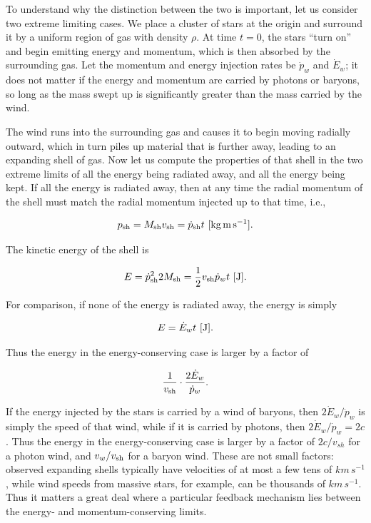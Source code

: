 \documentclass[a4paper,10pt]{article}
\begin{document}
{\noindent}To understand why the distinction between the two is important, let us consider two extreme limiting cases. We place a cluster of stars at the origin and surround it by a uniform region of gas with density $\rho$. At time $t=0$, the stars ``turn on'' and begin emitting energy and momentum, which is then absorbed by the surrounding gas. Let the momentum and energy injection rates be $\dot{p}_w$ and $\dot{E}_w$; it does not matter if the energy and momentum are carried by photons or baryons, so long as the mass swept up is significantly greater than the mass carried by the wind.

{\noindent}The wind runs into the surrounding gas and causes it to begin moving radially outward, which in turn piles up material that is further away, leading to an expanding shell of gas. Now let us compute the properties of that shell in the two extreme limits of all the energy being radiated away, and all the energy being kept. If all the energy is radiated away, then at any time the radial momentum of the shell must match the radial momentum injected up to that time, i.e.,

\begin{align*}
    p_{\rm sh} = M_{\rm sh}v_{\rm sh} = \dot{p}_{\rm sh}t ~ [{\rm kg\,m\,s^{-1}}].
\end{align*}

{\noindent}The kinetic energy of the shell is

\begin{align*}
    E = \dot{p}_{\rm sh}^2 2M_{\rm sh} = \frac{1}{2}v_{\rm sh}\dot{p}_wt ~ [{\rm J}].
\end{align*}

{\noindent}For comparison, if none of the energy is radiated away, the energy is simply

\begin{align*}
    E = \dot{E}_wt ~ [{\rm J}].
\end{align*}

{\noindent}Thus the energy in the energy-conserving case is larger by a factor of

\begin{align*}
    \frac{1}{v_{\rm sh}}\cdot\frac{2\dot{E}_w}{\dot{p}_w}.
\end{align*}

{\noindent}If the energy injected by the stars is carried by a wind of baryons, then $2\dot{E}_w/\dot{p}_w$ is simply the speed of that wind, while if it is carried by photons, then $2\dot{E}_w/\dot{p}_w=2c$. Thus the energy in the energy-conserving case is larger by a factor of $2c/v_{sh}$ for a photon wind, and $v_w/v_{\rm sh}$ for a baryon wind. These are not small factors: observed expanding shells typically have velocities of at most a few tens of $km\,s^{-1}$, while wind speeds from massive stars, for example, can be thousands of $km\,s^{-1}$. Thus it matters a great deal where a particular feedback mechanism lies between the energy- and momentum-conserving limits.
\end{document}
